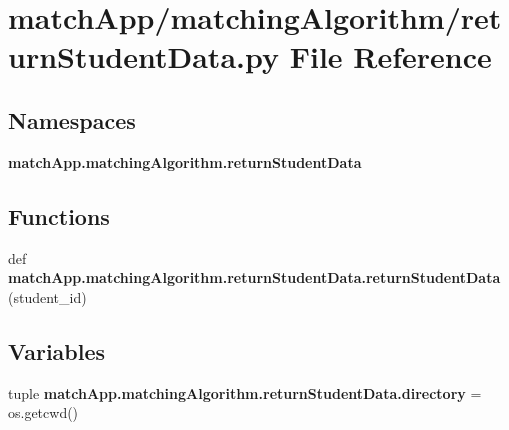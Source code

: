 \section{match\+App/matching\+Algorithm/return\+Student\+Data.py File Reference}
\label{return_student_data_8py}
\subsection*{Namespaces}
\begin{DoxyCompactItemize}
\item 
 {\bf match\+App.\+matching\+Algorithm.\+return\+Student\+Data}
\end{DoxyCompactItemize}
\subsection*{Functions}
\begin{DoxyCompactItemize}
\item 
def {\bf match\+App.\+matching\+Algorithm.\+return\+Student\+Data.\+return\+Student\+Data} (student\+\_\+id)
\end{DoxyCompactItemize}
\subsection*{Variables}
\begin{DoxyCompactItemize}
\item 
tuple {\bf match\+App.\+matching\+Algorithm.\+return\+Student\+Data.\+directory} = os.\+getcwd()
\end{DoxyCompactItemize}
